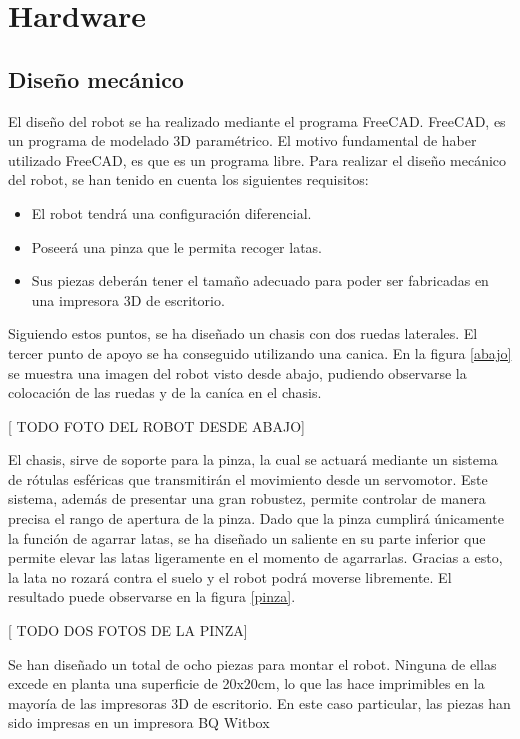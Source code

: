 \section{Hardware}
\label{hardware}


\subsection{Diseño mecánico}

El diseño del robot se ha realizado mediante el programa FreeCAD. FreeCAD, es un programa de modelado 3D paramétrico. El motivo fundamental de haber utilizado FreeCAD, es que es un programa libre. Para realizar el diseño mecánico del robot, se han tenido en cuenta los siguientes requisitos:

\begin{itemize}
	\item El robot tendrá una configuración diferencial.
	\item Poseerá una pinza que le permita recoger latas.
	\item Sus piezas deberán tener el tamaño adecuado para poder ser fabricadas en una impresora 3D de escritorio.
\end{itemize}

Siguiendo estos puntos, se ha diseñado un chasis con dos ruedas laterales. El tercer punto de apoyo se ha conseguido utilizando una canica. En la figura \ref{abajo} se muestra una imagen del robot visto desde abajo, pudiendo observarse la colocación de las ruedas y de la caníca en el chasis.

[ TODO FOTO DEL ROBOT DESDE ABAJO]

El chasis, sirve de soporte para la pinza, la cual se actuará mediante un sistema de rótulas esféricas que transmitirán el movimiento desde un servomotor. Este sistema, además de presentar una gran robustez, permite controlar de manera precisa el rango de apertura de la pinza. Dado que la pinza cumplirá únicamente la función de agarrar latas, se ha diseñado un saliente en su parte inferior que permite elevar las latas ligeramente en el momento de agarrarlas. Gracias a esto, la lata no rozará contra el suelo y el robot podrá moverse libremente. El resultado puede observarse en la figura \ref{pinza}.

[ TODO DOS FOTOS DE LA PINZA]

Se han diseñado un total de ocho piezas para montar el robot. Ninguna de ellas excede en planta una superficie de 20x20cm, lo que las hace imprimibles en la mayoría de las impresoras 3D de escritorio. En este caso particular, las piezas han sido impresas en un impresora BQ Witbox





